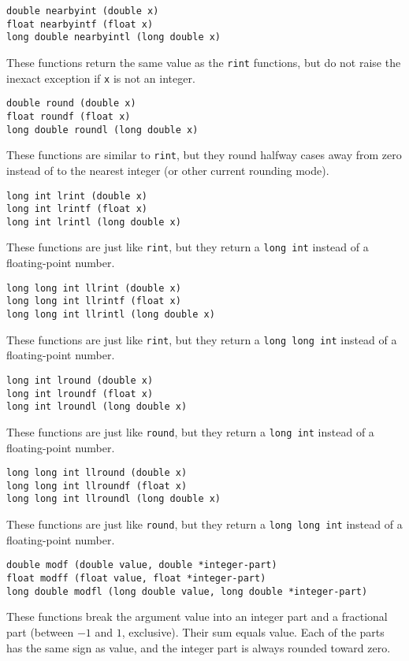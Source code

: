 \documentclass[12pt, titlepage]{article}
\renewcommand{\tt}[1]{\texttt{\small #1}}
\begin{document}
\begin{verbatim}
double nearbyint (double x)
float nearbyintf (float x)
long double nearbyintl (long double x)
\end{verbatim}
These functions return the same value as the \tt{rint} functions, but do not raise the inexact exception if \tt{x} is not an integer.

\begin{verbatim}
double round (double x)
float roundf (float x)
long double roundl (long double x)
\end{verbatim}
These functions are similar to \tt{rint}, but they round halfway cases away from zero instead of to the nearest integer (or other current rounding mode).

\begin{verbatim}
long int lrint (double x)
long int lrintf (float x)
long int lrintl (long double x)
\end{verbatim}
These functions are just like \tt{rint}, but they return a \tt{long int} instead of a floating-point number.

\begin{verbatim}
long long int llrint (double x)
long long int llrintf (float x)
long long int llrintl (long double x)
\end{verbatim}
These functions are just like \tt{rint}, but they return a \tt{long long int} instead of a floating-point number.

\begin{verbatim}
long int lround (double x)
long int lroundf (float x)
long int lroundl (long double x)
\end{verbatim}
These functions are just like \tt{round}, but they return a \tt{long int} instead of a floating-point number.

\begin{verbatim}
long long int llround (double x)
long long int llroundf (float x)
long long int llroundl (long double x)
\end{verbatim}
These functions are just like \tt{round}, but they return a \tt{long long int} instead of a floating-point number.

\begin{verbatim}
double modf (double value, double *integer-part)
float modff (float value, float *integer-part)
long double modfl (long double value, long double *integer-part)
\end{verbatim}
These functions break the argument value into an integer part and a fractional part (between $-1$ and $1$, exclusive). Their sum equals value. Each of the parts has the same sign as value, and the integer part is always rounded toward zero.
\end{document}
